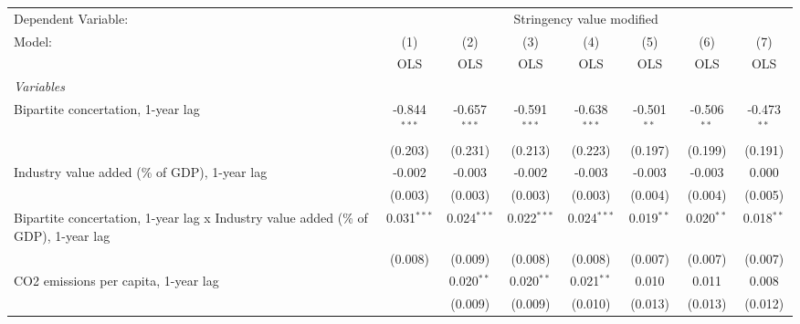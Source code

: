 
\begingroup
\centering
\begin{tabular}{lccccccc}
   \toprule
   Dependent Variable: & \multicolumn{7}{c}{Stringency value modified}\\
   Model:                                                                             & (1)            & (2)            & (3)            & (4)            & (5)           & (6)           & (7)\\  
                                                                                      &  OLS           & OLS            & OLS            & OLS            & OLS           & OLS           & OLS\\  
   \midrule
   \emph{Variables}\\
   Bipartite concertation, 1-year lag                                                 & -0.844$^{***}$ & -0.657$^{***}$ & -0.591$^{***}$ & -0.638$^{***}$ & -0.501$^{**}$ & -0.506$^{**}$ & -0.473$^{**}$\\   
                                                                                      & (0.203)        & (0.231)        & (0.213)        & (0.223)        & (0.197)       & (0.199)       & (0.191)\\   
   Industry value added (\% of GDP), 1-year lag                                       & -0.002         & -0.003         & -0.002         & -0.003         & -0.003        & -0.003        & 0.000\\   
                                                                                      & (0.003)        & (0.003)        & (0.003)        & (0.003)        & (0.004)       & (0.004)       & (0.005)\\   
   Bipartite concertation, 1-year lag x Industry value added (\% of GDP), 1-year lag  & 0.031$^{***}$  & 0.024$^{***}$  & 0.022$^{***}$  & 0.024$^{***}$  & 0.019$^{**}$  & 0.020$^{**}$  & 0.018$^{**}$\\   
                                                                                      & (0.008)        & (0.009)        & (0.008)        & (0.008)        & (0.007)       & (0.007)       & (0.007)\\   
   CO2 emissions per capita, 1-year lag                                               &                & 0.020$^{**}$   & 0.020$^{**}$   & 0.021$^{**}$   & 0.010         & 0.011         & 0.008\\   
                                                                                      &                & (0.009)        & (0.009)        & (0.010)        & (0.013)       & (0.013)       & (0.012)\\   

\end{tabular}
